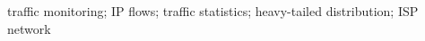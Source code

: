 \begin{abstract}
    \lipsum[1]
\end{abstract}

\begin{IEEEkeywords}
    traffic monitoring; IP flows; traffic statistics; heavy-tailed distribution; ISP network
\end{IEEEkeywords}